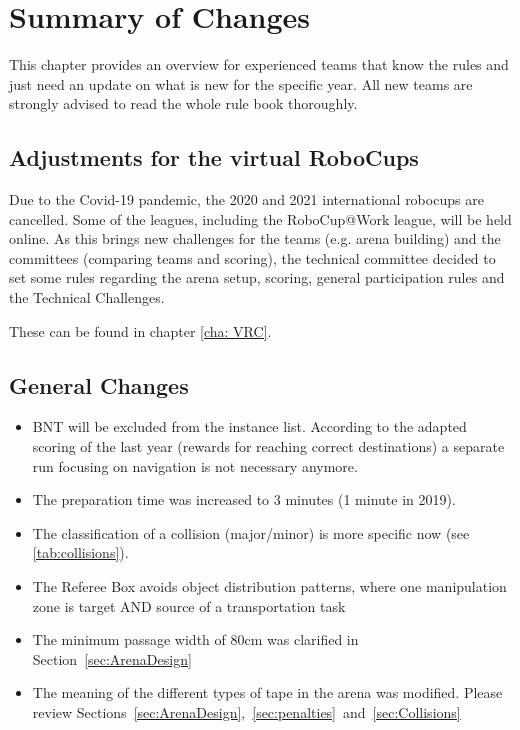 
\chapter{Summary of Changes}

This chapter provides an overview for experienced teams that know the rules and just need an update on what is new for the specific year. 
All new teams are strongly advised to read the whole rule book thoroughly.

\section{Adjustments for the virtual RoboCups}

Due to the Covid-19 pandemic, the 2020 and 2021 international robocups are cancelled. 
Some of the leagues, including the RoboCup@Work league, will be held online.
As this brings new challenges for the teams (e.g. arena building) and the committees (comparing teams and scoring),
the technical committee decided to set some rules regarding the arena setup, scoring, general participation rules and the Technical Challenges.

These can be found in chapter \ref{cha: VRC}.  


\section{General Changes}
\begin{itemize}
  \item BNT will be excluded from the instance list. According to the adapted scoring of the last year (rewards for reaching correct destinations) a separate run focusing on navigation is not necessary anymore.
  \item The preparation time was increased to 3 minutes (1 minute in 2019).
  \item The classification of a collision (major/minor) is more specific now (see \ref{tab:collisions}).
  \item The Referee Box avoids object distribution patterns, where one manipulation zone is target AND source of a transportation task
  \item The minimum passage width of 80cm was clarified in Section~\ref{sec:ArenaDesign}
  \item The meaning of the different types of tape in the arena was modified. Please review Sections~\ref{sec:ArenaDesign},~\ref{sec:penalties}~and~\ref{sec:Collisions}
\end{itemize}

